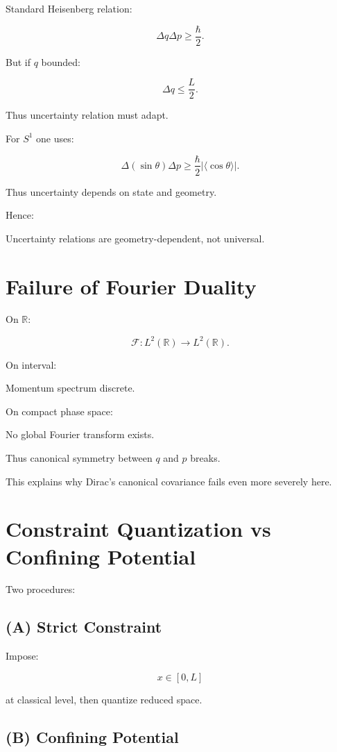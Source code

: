 \documentclass[11pt]{book}
\begin{document}
Standard Heisenberg relation:

\[
\Delta q \Delta p \ge \frac{\hbar}{2}.
\]

But if $q$ bounded:

\[
\Delta q \le \frac{L}{2}.
\]

Thus uncertainty relation must adapt.

For $S^1$ one uses:

\[
\Delta(\sin\theta)\Delta p
\ge
\frac{\hbar}{2}
|\langle \cos\theta\rangle|.
\]

Thus uncertainty depends on state and geometry.

Hence:

Uncertainty relations are geometry-dependent,
not universal.

\section{Failure of Fourier Duality}

On $\mathbb{R}$:

\[
\mathcal{F}: L^2(\mathbb{R}) \to L^2(\mathbb{R}).
\]

On interval:

Momentum spectrum discrete.

On compact phase space:

No global Fourier transform exists.

Thus canonical symmetry between $q$ and $p$ breaks.

This explains why Dirac’s canonical covariance fails even more severely here.

\section{Constraint Quantization vs Confining Potential}

Two procedures:

\subsection*{(A) Strict Constraint}

Impose:

\[
x \in [0,L]
\]

at classical level,
then quantize reduced space.

\subsection*{(B) Confining Potential}
\end{document}
